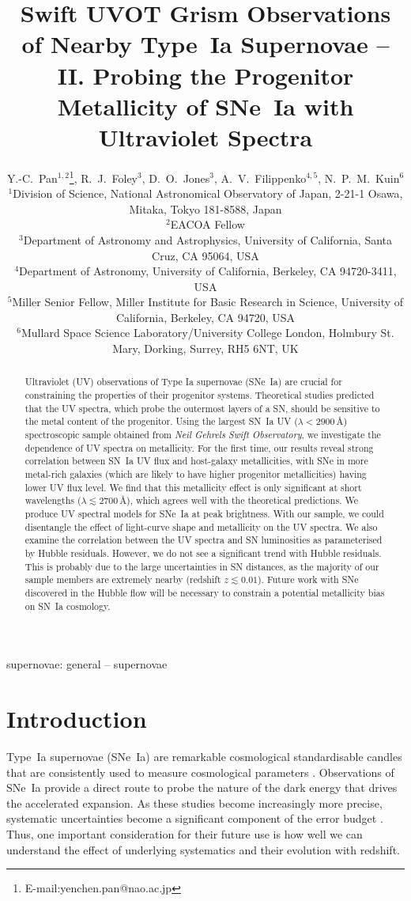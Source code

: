 \documentclass[useAMS,usenatbib]{mn2e}
\title[Swift SNe~Ia]{Swift UVOT Grism Observations of Nearby Type~Ia Supernovae -- II. Probing the Progenitor Metallicity of SNe~Ia with Ultraviolet Spectra}
\author[Pan et al.]{
Y.-C.~Pan$^{1,2}$\thanks{E-mail:yenchen.pan@nao.ac.jp},
R.~J.~Foley$^{3}$,
D.~O.~Jones$^{3}$,
A.~V.~Filippenko$^{4,5}$,
N.~P.~M.~Kuin$^{6}$
\\
  $^{1}$Division of Science, National Astronomical Observatory of Japan, 2-21-1 Osawa, Mitaka, Tokyo 181-8588, Japan\\
  $^{2}$EACOA Fellow\\
  $^{3}$Department of Astronomy and Astrophysics, University of California, Santa Cruz, CA 95064, USA\\
  $^{4}$Department of Astronomy, University of California, Berkeley, CA 94720-3411, USA\\
  $^{5}$Miller Senior Fellow, Miller Institute for Basic Research in Science, University of California, Berkeley, CA 94720, USA\\
  $^{6}$Mullard Space Science Laboratory/University College London, Holmbury St. Mary, Dorking, Surrey, RH5 6NT, UK\\
}
\begin{document}
\maketitle

\label{firstpage}

\begin{abstract}
Ultraviolet (UV) observations of Type Ia supernovae (SNe~Ia) are crucial for constraining the properties of their progenitor systems. Theoretical studies predicted that the UV spectra, which probe the outermost layers of a SN, should be sensitive to the metal content of the progenitor. Using the largest SN~Ia UV ($\lambda<2900$\,\AA) spectroscopic sample obtained from {\it Neil Gehrels Swift Observatory}, we investigate the dependence of UV spectra on metallicity. For the first time, our results reveal strong correlation between SN~Ia UV flux and host-galaxy metallicities, with SNe in more metal-rich galaxies (which are likely to have higher progenitor metallicities) having lower UV flux level. We find that this metallicity effect is only significant at short wavelengths ($\lambda\lesssim2700$\,\AA), which agrees well with the theoretical predictions. We produce UV spectral models for SNe~Ia at peak brightness. With our sample, we could disentangle the effect of light-curve shape and metallicity on the UV spectra. We also examine the correlation between  the UV spectra and SN luminosities as parameterised by Hubble residuals. However, we do not see a significant trend with Hubble residuals. This is probably due to the large uncertainties in SN distances, as the majority of our sample members are extremely nearby (redshift $z\lesssim0.01$). Future work with SNe discovered in the Hubble flow will be necessary to constrain a potential metallicity bias on SN~Ia cosmology.
\end{abstract}

\begin{keywords}
supernovae: general -- supernovae
\end{keywords}


\section{Introduction}
\label{sec:introduction}

Type~Ia supernovae (SNe~Ia) are remarkable cosmological standardisable candles that are consistently used to measure cosmological parameters \citep[e.g.,][]{1998AJ....116.1009R,1999ApJ...517..565P,2007ApJ...659...98R,2009ApJS..185...32K,2012ApJ...746...85S,2014ApJ...795...44R,2014A&A...568A..22B,2016ApJ...826...56R,2018ApJ...853..126R,2018ApJ...859..101S}. Observations of SNe~Ia provide a direct route to probe the nature of the dark energy that drives the accelerated expansion. As these studies become increasingly more precise, systematic uncertainties become a significant component of the error budget \citep[e.g.,][]{2011ApJS..192....1C}. Thus, one important consideration for their future use is how well we can understand the effect of underlying systematics and their evolution with redshift.
\end{document}
